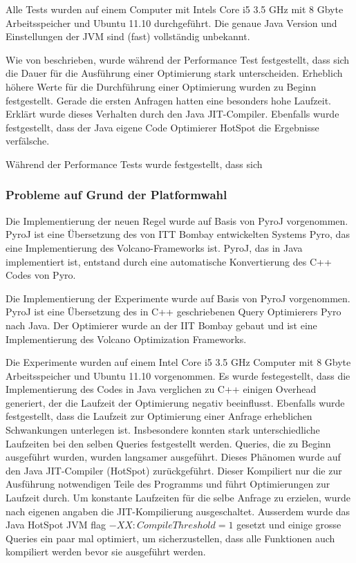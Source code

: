 Alle Tests wurden auf einem Computer mit Intels Core i5 3.5 GHz mit 8 Gbyte Arbeitsspeicher und Ubuntu 11.10 durchgeführt. Die genaue Java Version und Einstellungen der JVM sind (fast) vollständig unbekannt.

Wie von \cite{shanbhag2014optimizing} beschrieben, wurde während der Performance Test festgestellt, dass sich die Dauer für die Ausführung einer Optimierung stark unterscheiden. Erheblich höhere Werte für die Durchführung einer Optimierung wurden zu Beginn festgestellt. Gerade die ersten Anfragen hatten eine besonders hohe Laufzeit. Erklärt wurde dieses Verhalten durch den Java \ac{JIT}-Compiler. Ebenfalls wurde festgestellt, dass der Java eigene Code Optimierer HotSpot die Ergebnisse verfälsche. 

Während der Performance Tests wurde festgestellt, dass sich


\subsubsection{Probleme auf Grund der Platformwahl}
Die Implementierung der neuen Regel wurde auf Basis von PyroJ vorgenommen. PyroJ ist eine Übersetzung des von ITT Bombay entwickelten Systems Pyro, das eine Implementierung des Volcano-Frameworks ist. PyroJ, das in Java implementiert ist, entstand durch eine automatische Konvertierung des C++ Codes von Pyro. 

Die Implementierung der Experimente wurde auf Basis von PyroJ vorgenommen. PyroJ ist eine Übersetzung des in C++ geschriebenen Query Optimierers Pyro nach Java. Der Optimierer wurde an der IIT Bombay gebaut und ist eine Implementierung des Volcano Optimization Frameworks.

Die Experimente wurden auf einem Intel Core i5 3.5 GHz Computer mit 8 Gbyte Arbeitsspeicher und Ubuntu 11.10 vorgenommen. Es wurde festegestellt, dass die Implementierung des Codes in Java verglichen zu C++ einigen Overhead generiert, der die Laufzeit der Optimierung negativ beeinflusst. Ebenfalls wurde festgestellt, dass die Laufzeit zur Optimierung einer Anfrage erheblichen Schwankungen unterlegen ist. Insbesondere konnten stark unterschiedliche Laufzeiten bei den selben Queries festgestellt werden. Queries, die zu Beginn ausgeführt wurden, wurden langsamer ausgeführt. Dieses Phänomen wurde auf den Java JIT-Compiler (HotSpot) zurückgeführt. Dieser Kompiliert nur die zur Ausführung notwendigen Teile des Programms und führt Optimierungen zur Laufzeit durch. Um konstante Laufzeiten für die selbe Anfrage zu erzielen, wurde nach eigenen angaben die JIT-Kompilierung ausgeschaltet. Ausserdem wurde das Java HotSpot JVM flag $-XX:CompileThreshold=1$ gesetzt und einige grosse Queries ein paar mal optimiert, um sicherzustellen, dass alle Funktionen auch kompiliert werden bevor sie ausgeführt werden.
 


